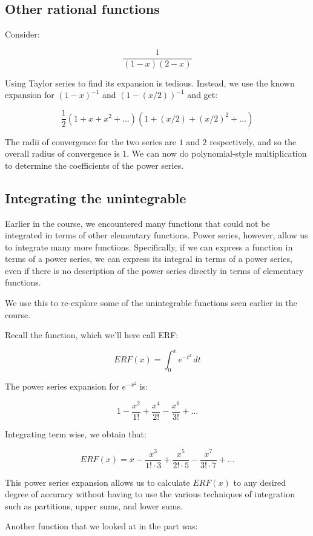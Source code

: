 \documentclass{amsart}
\begin{document}
\subsection{Other rational functions}

Consider:

$$\frac{1}{(1 - x)(2 - x)}$$

Using Taylor series to find its expansion is tedious. Instead, we use
the known expansion for $(1 - x)^{-1}$ and $(1 - (x/2))^{-1}$ and get:

$$\frac{1}{2}(1 + x + x^2 + \dots)(1 + (x/2) + (x/2)^2 + \dots)$$

The radii of convergence for the two series are $1$ and $2$
respectively, and so the overall radius of convergence is $1$. We can
now do polynomial-style multiplication to determine the coefficients
of the power series.

\subsection{Integrating the unintegrable}

Earlier in the course, we encountered many functions that could not be
integrated in terms of other elementary functions. Power series,
however, allow us to integrate many more functions. Specifically, if
we can express a function in terms of a power series, we can express
its integral in terms of a power series, even if there is no
description of the power series directly in terms of elementary
functions.

We use this to re-explore some of the unintegrable functions seen
earlier in the course.

Recall the function, which we'll here call ERF:

$$ERF(x) = \int_0^x e^{-t^2} \, dt$$

The power series expansion for $e^{-x^2}$ is:

$$1 - \frac{x^2}{1!} + \frac{x^4}{2!} - \frac{x^6}{3!} + \dots$$

Integrating term wise, we obtain that:

$$ERF(x) = x - \frac{x^3}{1!\cdot 3} + \frac{x^5}{2! \cdot 5} - \frac{x^7}{3! \cdot 7} + \dots$$

This power series expansion allows us to calculate $ERF(x)$ to any
desired degree of accuracy without having to use the various
techniques of integration such as partitions, upper sums, and lower sums.

Another function that we looked at in the part was:
\end{document}
